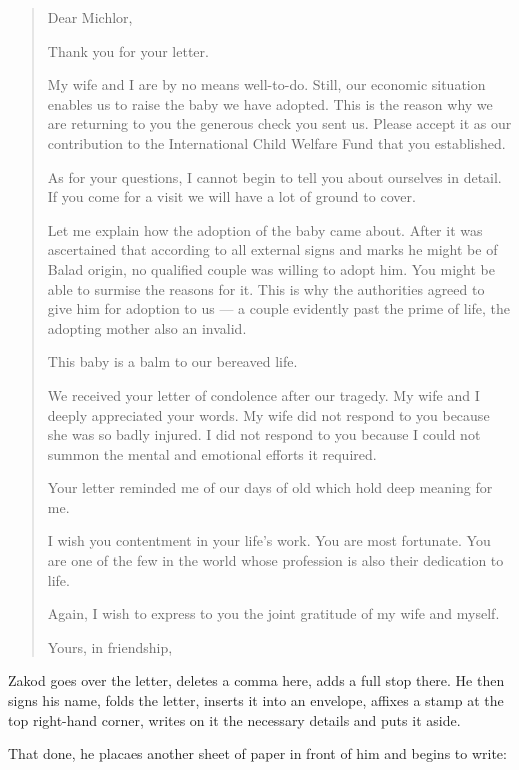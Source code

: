 \documentclass[twoside,11pt,openany]{book}
\begin{document}
\begin{quotation}
Dear Michlor,

Thank you for your letter.

My wife and I are by no means well-to-do. Still, our economic situation enables us to raise the baby we have adopted.
This is the reason why we are returning to you the generous check you sent us. Please accept it as our contribution to
the International Child Welfare Fund that you established.

As for your questions, I cannot begin to tell you about ourselves in detail. If you come for a visit we will have a lot
of ground to cover.

Let me explain how the adoption of the baby came about.  After it was ascertained that according to all external signs
and marks he might be of Balad origin, no qualified couple was willing to adopt him. You might be able to surmise the
reasons for it. This is why the authorities agreed to give him for adoption to us --- a couple evidently past the prime
of life, the adopting mother also an invalid.

This baby is a balm to our bereaved life.

We received your letter of condolence after our tragedy. My wife and I deeply appreciated your words. My wife did not
respond to you because she was so badly injured. I did not respond to you because I could not summon the mental and
emotional efforts it required.

Your letter reminded me of our days of old which hold deep meaning for me.

I wish you contentment in your life's work. You are most fortunate. You are one of the few in the world whose profession
is also their dedication to life.

Again, I wish to express to you the joint gratitude of my wife and myself.

Yours, in friendship,
\end{quotation}

Zakod goes over the letter, deletes a comma here, adds a full stop there. He then signs his name, folds the letter,
inserts it into an envelope, affixes a stamp at the top right-hand corner, writes on it the necessary details and puts it
aside.

That done, he placaes another sheet of paper in front of him and begins to write:
\pagebreak[4]
\end{document}
